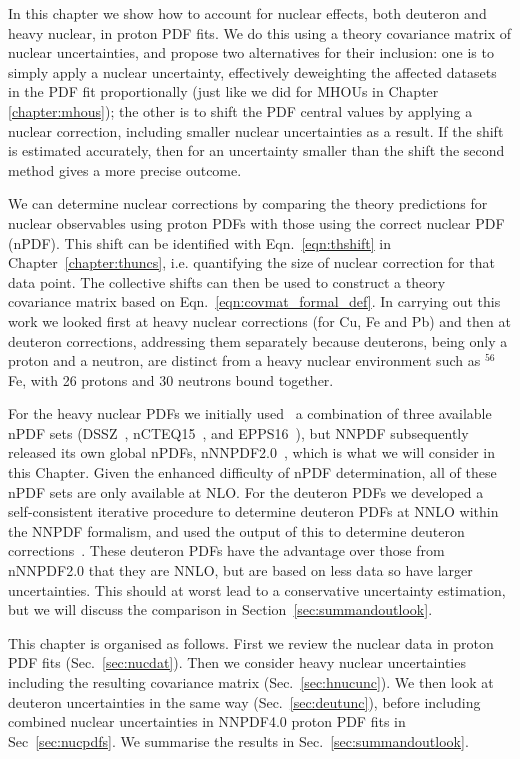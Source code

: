 In this chapter we show how to account for nuclear effects, both deuteron and heavy nuclear, in proton PDF fits. We do this using a theory covariance matrix of nuclear uncertainties, and propose two alternatives for their inclusion: one is to simply apply a nuclear uncertainty, effectively deweighting the affected datasets in the PDF fit proportionally (just like we did for MHOUs in Chapter \ref{chapter:mhous}); the other is to shift the PDF central values by applying a nuclear correction, including smaller nuclear uncertainties as a result. If the shift is estimated accurately, then for an uncertainty smaller than the shift the second method gives a more precise outcome.

We can determine nuclear corrections by comparing the theory predictions for nuclear observables using proton PDFs with those using the correct nuclear PDF (nPDF). This shift can be identified with Eqn.~\ref{eqn:thshift} in Chapter~\ref{chapter:thuncs}, i.e. quantifying the size of nuclear correction for that data point. The collective shifts can then be used to construct a theory covariance matrix based on Eqn.~\ref{eqn:covmat_formal_def}. In carrying out this work we looked first at heavy nuclear corrections (for Cu, Fe and Pb) and then at deuteron corrections, addressing them separately because deuterons, being only a proton and a neutron, are distinct from a heavy nuclear environment such as $^{56}$Fe, with 26 protons and 30 neutrons bound together. 

For the heavy nuclear PDFs we initially used~\cite{Ball:2018twp} a combination of three available nPDF sets (DSSZ~\cite{deFlorian:2011fp},
nCTEQ15~\cite{Kovarik:2015cma}, and EPPS16~\cite{Eskola:2016oht}), but NNPDF subsequently released its own global nPDFs, nNNPDF2.0~\cite{AbdulKhalek:2020yuc}, which is what we will consider in this Chapter. Given the enhanced difficulty of nPDF determination, all of these nPDF sets are only available at NLO. For the deuteron PDFs we developed a self-consistent iterative procedure to determine deuteron PDFs at NNLO within the NNPDF formalism, and used the output of this to determine deuteron corrections~\cite{Ball:2020xqw}. These deuteron PDFs have the advantage over those from nNNPDF2.0 that they are NNLO, but are based on less data so have larger uncertainties. This should at worst lead to a conservative uncertainty estimation, but we will discuss the comparison in Section~\ref{sec:summandoutlook}.

This chapter is organised as follows. First we review the nuclear data in proton PDF fits (Sec.~\ref{sec:nucdat}). Then we consider heavy nuclear uncertainties including the resulting covariance matrix (Sec.~\ref{sec:hnucunc}). We then look at deuteron uncertainties in the same way (Sec.~\ref{sec:deutunc}), before including combined nuclear uncertainties in NNPDF4.0 proton PDF fits in Sec~\ref{sec:nucpdfs}. We summarise the results in Sec.~\ref{sec:summandoutlook}.


